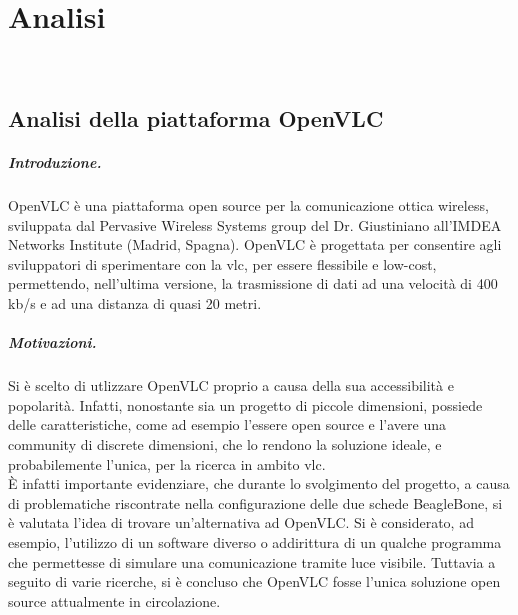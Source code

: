 \chapter{Analisi}
\label{cap:analisi}

\\

\section{Analisi della piattaforma OpenVLC}

\paragraph{Introduzione.}
OpenVLC è una piattaforma open source per la comunicazione ottica wireless, sviluppata dal Pervasive Wireless Systems group del Dr. Giustiniano all'IMDEA Networks Institute (Madrid, Spagna).
OpenVLC è progettata per consentire agli sviluppatori di sperimentare con la \gls{vlc}, per essere flessibile e low-cost, permettendo, nell'ultima versione, la trasmissione di dati ad una velocità di 400 kb/s e ad una distanza di quasi 20 metri.

\paragraph{Motivazioni.}
Si è scelto di utlizzare OpenVLC proprio a causa della sua accessibilità e popolarità. Infatti, nonostante sia un progetto di piccole dimensioni, possiede delle caratteristiche, come ad esempio l'essere open source e l'avere una community di discrete dimensioni, che lo rendono la soluzione ideale, e probabilemente l'unica, per la ricerca in ambito \gls{vlc}.\\
È infatti importante evidenziare, che durante lo svolgimento del progetto, a causa di problematiche riscontrate nella configurazione delle due schede BeagleBone, si è valutata l'idea di trovare un'alternativa ad OpenVLC. Si è considerato, ad esempio, l'utilizzo di un software diverso o addirittura di un qualche programma che permettesse di simulare una comunicazione tramite luce visibile. Tuttavia a seguito di varie ricerche, si è concluso che OpenVLC fosse l'unica soluzione open source attualmente in circolazione.

